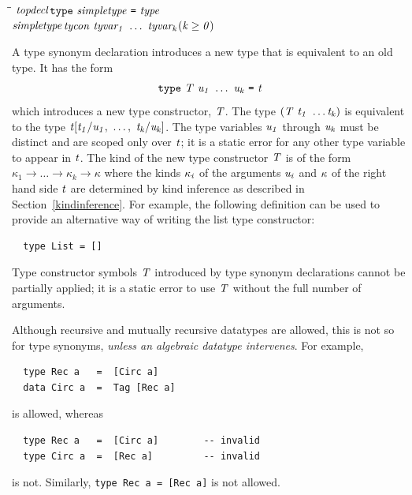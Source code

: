 \begin{flushleft}\it\begin{tabbing}
\hspace{0.6in}\=\hspace{3.1in}\=\kill
$\it topdecl$\>\makebox[3.5em]{$\rightarrow$}$\it \makebox{\tt type}\ simpletype\ \makebox{\tt =}\ type$\\ 
$\it simpletype$\>\makebox[3.5em]{$\rightarrow$}$\it tycon\ tyvar_1\ \ldots \ tyvar_k$\>\makebox[3em]{}$\it (k\geq 0)$
\end{tabbing}\end{flushleft}
%
%
A type synonym declaration introduces a new type that
is equivalent to an old type.  It has the form
\[
\mbox{$\it \makebox{\tt type}\ T\ u_1\ \ldots \ u_k\ \makebox{\tt =}\ t$}
\]
which introduces a new type constructor, \mbox{$\it T$}.  The type \mbox{$\it (T\ t_1\ \ldots \\
\it t_k)$} is equivalent to the type \mbox{$\it t[t_1/u_1,\ \ldots ,\ t_k/u_k]$}.  The type
variables \mbox{$\it u_1$} through \mbox{$\it u_k$} must be distinct and are scoped only
over \mbox{$\it t$}; it is a static error for any other type variable to appear
in \mbox{$\it t$}.  The kind of the new type constructor \mbox{$\it T$} is of the form
$\kappa_1\rightarrow\ldots\rightarrow\kappa_k\rightarrow\kappa$ where
the kinds \mbox{$\it \kappa_i$} of the arguments \mbox{$\it u_i$} and \mbox{$\it \kappa$} of the right hand
side \mbox{$\it t$} are determined by kind inference as described in
Section~\ref{kindinference}.
For example, the following definition can be used to provide an alternative
way of writing the list type constructor: 
\bprog
{\small\begin{verbatim}
  type List = []
\end{verbatim}}
\eprog
Type constructor symbols \mbox{$\it T$} introduced by type synonym declarations cannot
be partially applied; it is a static error to use \mbox{$\it T$} without the full number
of arguments.

Although recursive and mutually recursive datatypes are allowed,
this is not so for type synonyms, {\em unless an algebraic datatype
intervenes}.  For example,
\bprog
{\small\begin{verbatim}
  type Rec a   =  [Circ a]
  data Circ a  =  Tag [Rec a]
\end{verbatim}}
\eprog
is allowed, whereas
\bprog
{\small\begin{verbatim}
  type Rec a   =  [Circ a]        -- invalid
  type Circ a  =  [Rec a]         -- invalid
\end{verbatim}}
\eprog
is not. Similarly, \mbox{\tt type\ Rec\ a\ =\ [Rec\ a]} is not allowed.

